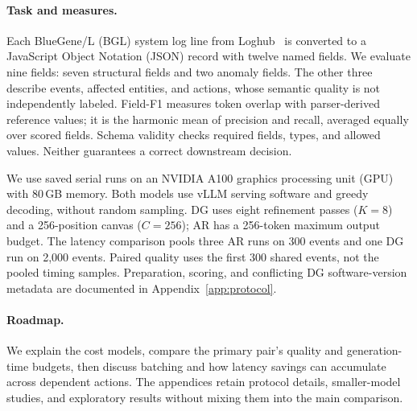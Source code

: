 \paragraph{Task and measures.}
Each BlueGene/L (BGL) system log line from Loghub~\cite{loghub} is converted to a JavaScript Object
Notation (JSON) record with twelve named fields. We evaluate nine fields:
seven structural fields and two anomaly fields. The other three describe
events, affected entities, and actions, whose semantic quality is not
independently labeled. Field-F1 measures token overlap with parser-derived
reference values; it is the harmonic mean of precision and recall, averaged
equally over scored fields. Schema validity checks required fields,
types, and allowed values. Neither guarantees a correct downstream decision.

We use saved serial runs on an NVIDIA A100 graphics processing unit (GPU)
with 80\,GB memory. Both models use vLLM serving software and greedy
decoding, without random sampling. DG uses eight refinement passes
($K=8$) and a 256-position canvas ($C=256$); AR has a 256-token maximum
output budget. The latency comparison pools three AR runs on
300 events and one DG run on 2,000 events. Paired quality uses the first
300 shared events, not the pooled timing samples.
Preparation, scoring, and conflicting DG software-version metadata
are documented in Appendix~\ref{app:protocol}.

\paragraph{Roadmap.}
We explain the cost models, compare the primary pair's quality and
generation-time budgets, then discuss batching and how latency savings
can accumulate across dependent actions. The appendices retain protocol details, smaller-model
studies, and exploratory results without mixing them into the main comparison.
